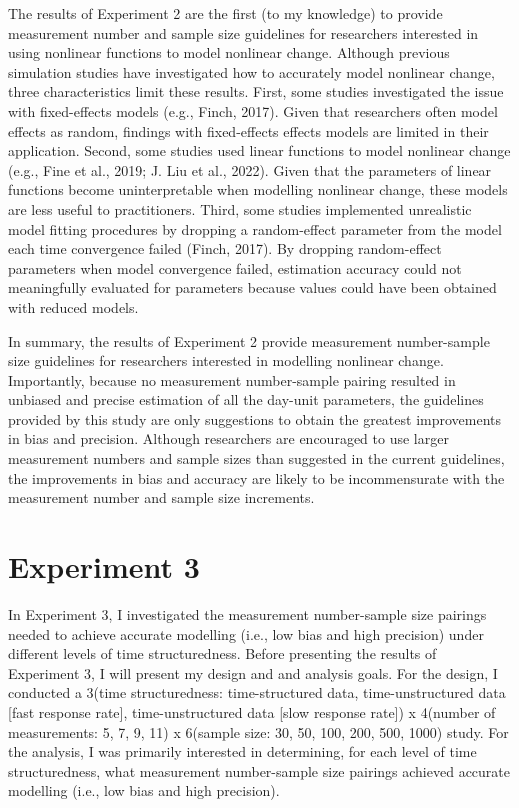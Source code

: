 \documentclass[
12pt, %
twoside,
english]{guelphthesis}
\theoremstyle{definition}
\theoremstyle{definition}
\theoremstyle{definition}
\theoremstyle{definition}
\theoremstyle{remark}
\begin{document}
The results of Experiment 2 are the first (to my knowledge) to provide measurement number and sample size guidelines for researchers interested in using nonlinear functions to model nonlinear change. Although previous simulation studies have investigated how to accurately model nonlinear change, three characteristics limit these results. First, some studies investigated the issue with fixed-effects models (e.g., Finch, 2017). Given that researchers often model effects as random, findings with fixed-effects effects models are limited in their application. Second, some studies used linear functions to model nonlinear change (e.g., Fine et al., 2019; J. Liu et al., 2022). Given that the parameters of linear functions become uninterpretable when modelling nonlinear change, these models are less useful to practitioners. Third, some studies implemented unrealistic model fitting procedures by dropping a random-effect parameter from the model each time convergence failed (Finch, 2017). By dropping random-effect parameters when model convergence failed, estimation accuracy could not meaningfully evaluated for parameters because values could have been obtained with reduced models.

In summary, the results of Experiment 2 provide measurement number-sample size guidelines for researchers interested in modelling nonlinear change. Importantly, because no measurement number-sample pairing resulted in unbiased and precise estimation of all the day-unit parameters, the guidelines provided by this study are only suggestions to obtain the greatest improvements in bias and precision. Although researchers are encouraged to use larger measurement numbers and sample sizes than suggested in the current guidelines, the improvements in bias and accuracy are likely to be incommensurate with the measurement number and sample size increments.

\hypertarget{experiment-3}{%
\chapter{Experiment 3}\label{experiment-3}}

In Experiment 3, I investigated the measurement number-sample size pairings needed to achieve accurate modelling (i.e., low bias and high precision) under different levels of time structuredness. Before presenting the results of Experiment 3, I will present my design and and analysis goals. For the design, I conducted a 3(time structuredness: time-structured data, time-unstructured data {[}fast response rate{]}, time-unstructured data {[}slow response rate{]}) x 4(number of measurements: 5, 7, 9, 11) x 6(sample size: 30, 50, 100, 200, 500, 1000) study. For the analysis, I was primarily interested in determining, for each level of time structuredness, what measurement number-sample size pairings achieved accurate modelling (i.e., low bias and high precision).
\end{document}
